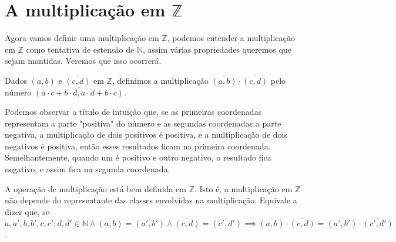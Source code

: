 \documentclass[../main.tex]{subfiles}
\begin{document}
\section{A multiplicação em $\mathbb{Z}$}
Agora vamos definir uma multiplicação em $\mathbb{Z}$, podemos entender a multiplicação em $\mathbb{Z}$ como tentativa de estensão de $\mathbb{N}$, assim várias propriedades queremos que sejam mantidas. Veremos que isso ocorrerá.
\begin{defi}\label{int-def-multiplicacao}
    Dados $\overline{(a,b)}$ e $\overline{(c,d)}$ em $\mathbb{Z}$, definimos a multiplicação $\overline{(a,b)} \cdot \overline{(c,d)}$ pelo número $\overline{(a \cdot c + b \cdot d, a \cdot d + b \cdot c)}$.
\end{defi}
Podemos observar a título de intuição que, se as primeiras coordenadas representam a parte "positiva" do número e as segundas coordenadas a parte negativa, a multiplicação de dois positivos é positiva, e a multiplicação de dois negativos é positiva, então esses resultados ficam na primeira coordenada. Semelhantemente, quando um é positivo e outro negativo, o resultado fica negativo, e assim fica na segunda coordenada.
\begin{teo}
    A operação de multiplicação está bem definida em $\mathbb{Z}$. Isto é, a multiplicação em $\mathbb{Z}$ não depende do representante das classes envolvidas na multiplicação. Equivale a dizer que, se \\
    $a,a',b,b',c,c',d,d' \in \mathbb{N} \land \overline{(a,b)} = \overline{(a',b')} \land \overline{(c,d)} = \overline{(c',d')}
    \implies \overline{(a,b)} \cdot \overline{(c,d)} = \overline{(a',b')} \cdot \overline{(c',d')} $.
\end{teo}
\end{document}
